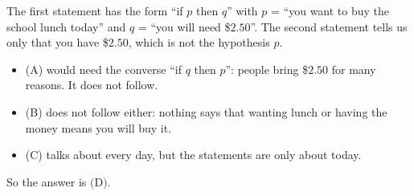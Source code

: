 The first statement has the form ``if $p$ then $q$'' with $p$ = ``you want to buy the school lunch today'' and $q$ = ``you will need \$$2.50$''. The second statement tells us only that you have \$$2.50$, which is not the hypothesis $p$.
\begin{itemize}
\item (A) would need the converse ``if $q$ then $p$'': people bring \$$2.50$ for many reasons. It does not follow.
\item (B) does not follow either: nothing says that wanting lunch or having the money means you will buy it.
\item (C) talks about every day, but the statements are only about today.
\end{itemize}
So the answer is $\boxed{\text{(D)}}$.

